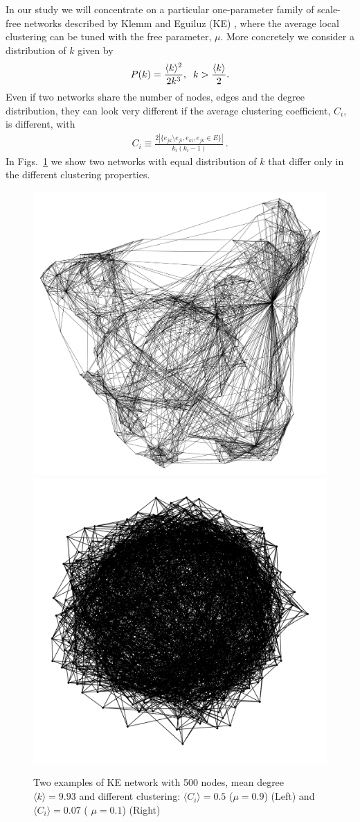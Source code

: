 \documentclass[a4paper,oneside,11pt]{article}
\begin{document}
In our study we will concentrate on a particular one-parameter family of scale-free networks described by Klemm and Eguiluz (KE)
\cite{Klemm_2002}, where the average local clustering can be tuned with the free parameter, \(\mu\). More concretely we consider a distribution of $k$ given by
 \begin{eqnarray}
  P(k) = {\langle k \rangle^2 \over 2 k^3},\;\;  k > {\langle k\rangle\over 2}.
  \end{eqnarray}
 Even if two networks share the number of nodes, edges and the degree distribution, they can look very different if the average clustering coefficient, $C_i$, is different, with
\begin{eqnarray}
C_i \equiv \frac{2|\{e_{jk}\setminus e_{ji},e_{ki},e_{jk}\in E\}|}{k_i(k_i-1)}\,.
\end{eqnarray}
In Figs.~\ref{fig:networks} we show two networks with equal distribution of $k$ that differ only in the  different clustering properties.

\begin{figure}[htbp]
\centering
\includegraphics[width=.45\linewidth]{ke_05_09.pdf} \includegraphics[width=.45\linewidth]{ke_05_01.pdf}
\caption{Two examples of KE network with 500 nodes, mean degree \(\langle k \rangle=9.93\) and different clustering: \(\langle C_i \rangle = 0.5\) (\(\mu=0.9\)) (Left) and \(\langle C_i \rangle = 0.07\) ( \(\mu=0.1\)) (Right)}
\label{fig:networks}
\end{figure}
\end{document}
